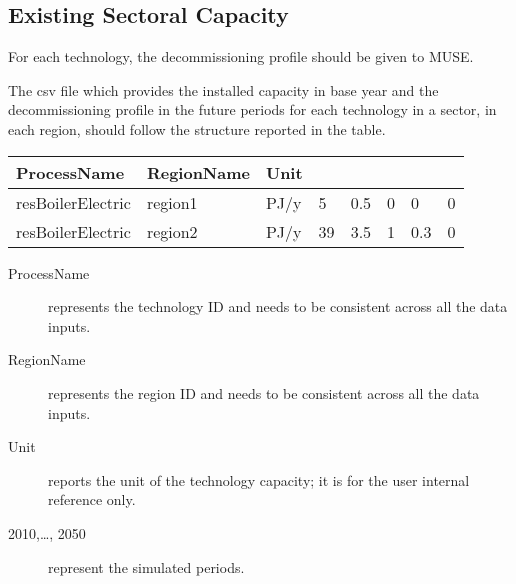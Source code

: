 \documentclass[letterpaper,10pt,english]{sphinxmanual}
\begin{document}
\subsection{Existing Sectoral Capacity}
\label{\detokenize{inputs/existing_capacity:existing-sectoral-capacity}}\label{\detokenize{inputs/existing_capacity:inputs-existing-capacity}}\label{\detokenize{inputs/existing_capacity::doc}}
For each technology, the decommissioning profile should be given to MUSE.

The csv file which provides the installed capacity in base year and the decommissioning
profile in the future periods for each technology in a sector, in each region, should
follow the structure reported in the table.


\begin{savenotes}\sphinxattablestart
\centering
{}
\sphinxthecaptionisattop
{}\label{\detokenize{inputs/existing_capacity:id1}}
\sphinxaftertopcaption
\begin{tabulary}{\linewidth}[t]{|T|T|T|T|T|T|T|T|}
\hline
\sphinxstyletheadfamily 
ProcessName
&\sphinxstyletheadfamily 
RegionName
&\sphinxstyletheadfamily 
Unit
&
&
&
&
&
\\
\hline
resBoilerElectric
&
region1
&
PJ/y
&
5
&
0.5
&
0
&
0
&
0
\\
\hline
resBoilerElectric
&
region2
&
PJ/y
&
39
&
3.5
&
1
&
0.3
&
0
\\
\hline
\end{tabulary}
\par
\sphinxattableend\end{savenotes}
\begin{description}
\item[{ProcessName}] \leavevmode
represents the technology ID and needs to be consistent across all the data inputs.

\item[{RegionName}] \leavevmode
represents the region ID and needs to be consistent across all the data inputs.

\item[{Unit}] \leavevmode
reports the unit of the technology capacity; it is for the user internal reference only.

\item[{2010,…, 2050}] \leavevmode
represent the simulated periods.

\end{description}
\end{document}
